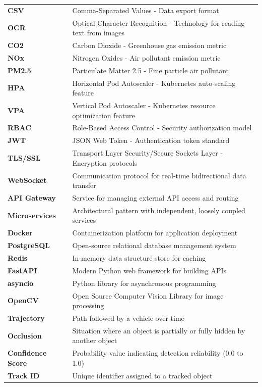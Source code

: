 \documentclass[12pt,a4paper]{article}
\begin{document}
\begin{longtable}{|p{4cm}|p{10cm}|}
\textbf{CSV} & Comma-Separated Values - Data export format \\
\textbf{OCR} & Optical Character Recognition - Technology for reading text from images \\
\textbf{CO2} & Carbon Dioxide - Greenhouse gas emission metric \\
\textbf{NOx} & Nitrogen Oxides - Air pollutant emission metric \\
\textbf{PM2.5} & Particulate Matter 2.5 - Fine particle air pollutant \\
\textbf{HPA} & Horizontal Pod Autoscaler - Kubernetes auto-scaling feature \\
\textbf{VPA} & Vertical Pod Autoscaler - Kubernetes resource optimization feature \\
\textbf{RBAC} & Role-Based Access Control - Security authorization model \\
\textbf{JWT} & JSON Web Token - Authentication token standard \\
\textbf{TLS/SSL} & Transport Layer Security/Secure Sockets Layer - Encryption protocols \\
\textbf{WebSocket} & Communication protocol for real-time bidirectional data transfer \\
\textbf{API Gateway} & Service for managing external API access and routing \\
\textbf{Microservices} & Architectural pattern with independent, loosely coupled services \\
\textbf{Docker} & Containerization platform for application deployment \\
\textbf{PostgreSQL} & Open-source relational database management system \\
\textbf{Redis} & In-memory data structure store for caching \\
\textbf{FastAPI} & Modern Python web framework for building APIs \\
\textbf{asyncio} & Python library for asynchronous programming \\
\textbf{OpenCV} & Open Source Computer Vision Library for image processing \\
\textbf{Trajectory} & Path followed by a vehicle over time \\
\textbf{Occlusion} & Situation where an object is partially or fully hidden by another object \\
\textbf{Confidence Score} & Probability value indicating detection reliability (0.0 to 1.0) \\
\textbf{Track ID} & Unique identifier assigned to a tracked object \\

\end{longtable}
\end{document}
